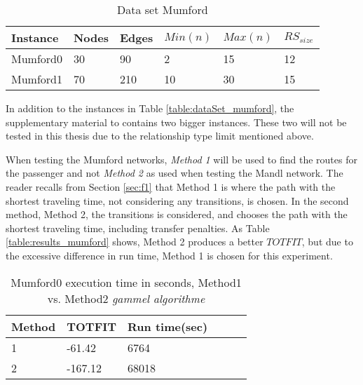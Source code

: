 \begin{table}[H]
	\centering
	\begin{tabular}{|l|l|l|l|l|l|}
    	\hline
    	Instance & Nodes&Edges & $Min(n)$ & $Max(n)$ & $RS_{size}$\\
    	\hline
   	    Mumford0 & 30&90 & 2&15 & 12 \\
   	    Mumford1 & 70&210 & 10&30 & 15 \\
   	    \hline
    \end{tabular}
    \caption{Data set Mumford}
    \label{table:dataSet_mumford}
\end{table}

In addition to the instances in Table \vref{table:dataSet_mumford}, the supplementary material to \citet{mumford13} contains two bigger instances. These two will not be tested in this thesis due to the relationship type limit mentioned above. 

When testing the Mumford networks, \textit{Method 1} will be used to find the routes for the passenger and not \textit{Method 2} as used when testing the Mandl network. The reader recalls from Section \vref{sec:f1} that Method 1 is where the path with the shortest traveling time, not considering any transitions, is chosen. In the second method, Method 2, the transitions is considered, and chooses the path with the shortest traveling time, including transfer penalties. As Table \vref{table:results_mumford} shows, Method 2 produces a better $TOTFIT$, but due to the excessive difference in run time, Method 1 is chosen for this experiment. 

\begin{table}[H]
    \centering
    \begin{tabular}{|l|l|l|l|l|l|}
        \hline
        Method & TOTFIT & Run time(sec) \\
        \hline
        1 & -61.42 & 6764 \\
        2 & -167.12 & 68018 \\
        \hline
    \end{tabular}
    \caption{Mumford0 execution time in seconds, Method1 vs. Method2 \emph{\color{blue} gammel algorithme}}
    \label{table:results_mumford}
\end{table}

